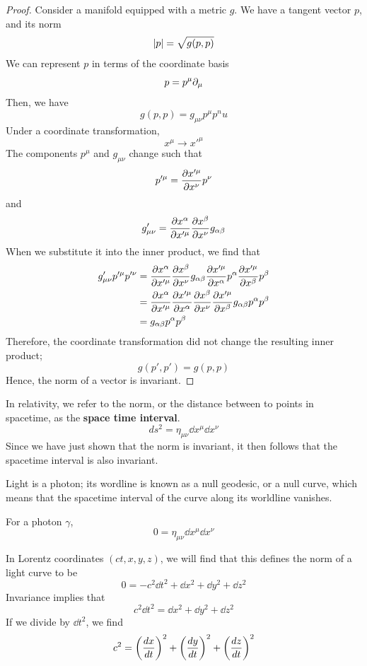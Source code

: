 		\begin{proof}
			Consider a manifold equipped with a metric 
			$g$. We have a tangent vector $p$, and its norm
			\[
				\abs{p} = \sqrt{g(p,p)}
			\]
			We can represent $p$ in terms of the coordinate basis
			\[
				p = p^\mu \partial_\mu
			\]
			Then, we have
			\[
				g(p,p) = g_{\mu\nu}p^\mu p^nu
			\]
			Under a coordinate transformation,
			\[
				x^\mu\to x'^\mu
			\]
			The components $p^\mu$ and $g_{\mu\nu}$ change such that
			\[
				p'^\mu = 
				\pdv{x'^\mu}{x^\nu} p^\nu 
			\]
			and
			\[
				g'_{\mu\nu} = 
				\pdv{x^\alpha}{x'^\mu} 
				\pdv{x^\beta}{x^\nu} 
				g_{\alpha\beta}
			\]
			When we substitute it into the inner product, we 
			find that 
			\begin{align*}
				g'_{\mu\nu}
				p'^\mu
				p'^\nu
				&=
				\pdv{x^\alpha}{x'^\mu} 
				\pdv{x^\beta}{x^\nu} 
				g_{\alpha\beta}
				\pdv{x'^\mu}{x^\alpha} p^\alpha 
				\pdv{x'^\mu}{x^\beta} p^\beta\\
				&=
				\pdv{x^\alpha}{x'^\mu} 
				\pdv{x'^\mu}{x^\alpha} 
				\pdv{x^\beta}{x^\nu} 
				\pdv{x'^\mu}{x^\beta}
				g_{\alpha\beta}
				p^\alpha 
				p^\beta\\
				&= 
				g_{\alpha\beta}
				p^\alpha
				p^\beta
			\end{align*}
			Therefore, the coordinate transformation did not change 
			the resulting inner product;
			\[
				g(p',p') = g(p,p)
			\]
			Hence, the norm of a vector is invariant.
		\end{proof}
		
		In relativity, we refer to the norm, or the distance 
		between to points in spacetime, as the \textbf{space time interval}.
		\[
			ds^2 = \eta_{\mu\nu}\dd{x^\mu}\dd{x^\nu}
		\]
		Since we have just shown that the norm is invariant, it then
		follows that the spacetime interval is also invariant. 

		Light is a photon; its wordline is known as a null geodesic, or
		a null curve,
		which means that the spacetime interval of the curve
		along its worldline vanishes.

		For a photon $\gamma$,
		\[
			0 = \eta_{\mu\nu}\dd{x^\mu}\dd{x^\nu}
		\]
		
		In Lorentz coordinates $(ct,x,y,z)$, we will find that this defines 
		the norm of a light curve to be
		\[
			0 = -c^2 \dd{t}^2 + \dd{x}^2 + \dd{y}^2 + \dd{z}^2
		\]
		Invariance implies that
		\[
			c^2 \dd{t}^2 = \dd{x}^2 + \dd{y}^2 + \dd{z}^2
		\]
		If we divide by $\dd{t}^2$, we find
		\[
			c^2 = 
			\pqty{
				\dv{x}{t} 
			}^2
			+
			\pqty{
				\dv{y}{t} 
			}^2
			+
			\pqty{
				\dv{z}{t} 
			}^2
		\]

